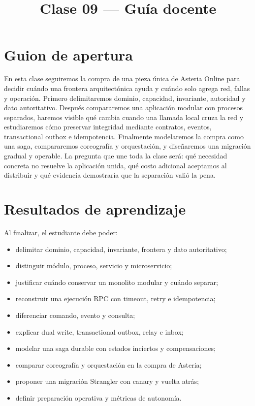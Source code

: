 \documentclass[variant=docente,cover=institutional,mode=screen]{ua-engineering-v6-article}
\title{Clase 09 --- Guía docente}
\author{\UAProfessor}
\date{\UADate}
\begin{document}
\maketitle

\section{Guion de apertura}

En esta clase seguiremos la compra de una pieza única de Asteria Online para decidir cuándo una frontera arquitectónica ayuda y cuándo solo agrega red, fallas y operación. Primero delimitaremos dominio, capacidad, invariante, autoridad y dato autoritativo. Después compararemos una aplicación modular con procesos separados, haremos visible qué cambia cuando una llamada local cruza la red y estudiaremos cómo preservar integridad mediante contratos, eventos, transactional outbox e idempotencia. Finalmente modelaremos la compra como una saga, compararemos coreografía y orquestación, y diseñaremos una migración gradual y operable. La pregunta que une toda la clase será: qué necesidad concreta no resuelve la aplicación unida, qué costo adicional aceptamos al distribuir y qué evidencia demostraría que la separación valió la pena.

\section{Resultados de aprendizaje}
Al finalizar, el estudiante debe poder:
\begin{itemize}
\item delimitar dominio, capacidad, invariante, frontera y dato autoritativo;
\item distinguir módulo, proceso, servicio y microservicio;
\item justificar cuándo conservar un monolito modular y cuándo separar;
\item reconstruir una ejecución RPC con timeout, retry e idempotencia;
\item diferenciar comando, evento y consulta;
\item explicar dual write, transactional outbox, relay e inbox;
\item modelar una saga durable con estados inciertos y compensaciones;
\item comparar coreografía y orquestación en la compra de Asteria;
\item proponer una migración Strangler con canary y vuelta atrás;
\item definir preparación operativa y métricas de autonomía.
\end{itemize}
\end{document}
